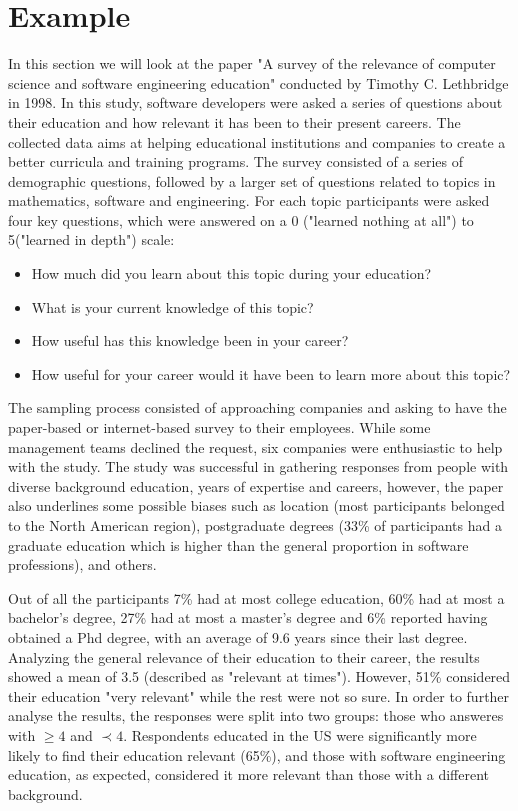 \documentclass{report}
\begin{document}
\chapter{Example}
In this section we will look at the paper "A survey of the relevance of computer science and software engineering education" conducted by Timothy C. Lethbridge in 1998. In this study, software developers were asked a series of questions about their education and how relevant it has been to their present careers. The collected data aims at helping educational institutions and companies to create a better curricula and training programs. The survey consisted of a series of demographic questions, followed by a larger set of questions related to topics in mathematics, software and engineering. For each topic participants were asked four key questions, which were answered on a 0 ("learned nothing at all") to 5("learned in depth") scale: 
\begin{itemize}
\item How much did you learn about this topic during your education?\\
\item What is your current knowledge of this topic?\\
\item How useful has this knowledge been in your career?\\
\item How useful for your career would it have been to learn more about this topic?\\
\end{itemize}

The sampling process consisted of approaching companies and asking to have the paper-based or internet-based survey to their employees. While some management teams declined the request, six companies were enthusiastic to help with the study. The study was successful in gathering responses from people with diverse background education, years of expertise and careers, however, the paper also underlines some possible biases such as location (most participants belonged to the North American region), postgraduate degrees (33\% of participants had a graduate education which is higher than the general proportion in software professions), and others.

Out of all the participants 7\% had at most college education, 60\% had at most a bachelor's degree, 27\% had at most a master's degree and 6\% reported having obtained a Phd degree, with an average of 9.6 years since their last degree. Analyzing the general relevance of their education to their career, the results showed a mean of 3.5 (described as "relevant at times"). However, 51\% considered their education "very relevant" while the rest were not so sure. In order to further analyse the results, the responses were split into two groups: those who answeres with $\geq4$ and $\prec4$.  Respondents educated in the US were significantly more likely to find their education
relevant (65\%), and those with software engineering education, as expected, considered it more relevant than those with a different background. 
\end{document}
